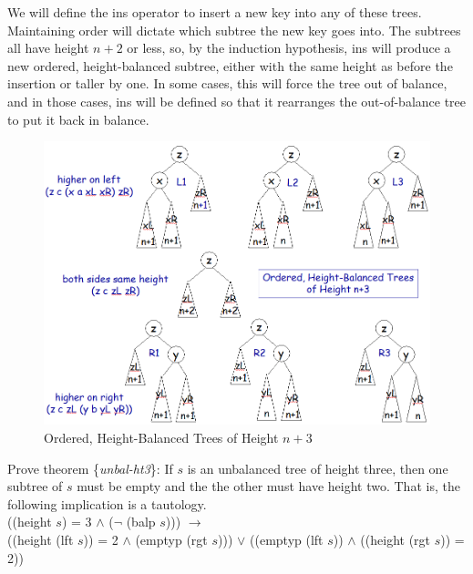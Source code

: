 We will define the ins operator to insert a new key into any of these trees.
Maintaining order will dictate which subtree the new key goes into.
The subtrees all have height $n+2$ or less, so, by the induction hypothesis,
ins will produce a new ordered, height-balanced subtree,
either with the same height as before the insertion or taller by one.
In some cases, this will force the tree out of balance,
and in those cases, ins will be defined so that it rearranges
the out-of-balance tree to put it back in balance.

\begin{figure}
\begin{center}
\includegraphics[scale=0.5]{images/avl-trees-ht3-or-more.png}
\end{center}
\caption{Ordered, Height-Balanced Trees of Height $n+3$}
\label{fig:trees-of-ht-n+3}
\end{figure}

\begin{ExerciseList}
\Exercise Prove
\label{thm:unbal-ht3}
theorem \{\emph{unbal-ht3}\}:
If $s$ is an unbalanced tree of height three,
then one subtree of $s$ must be empty and the the other must have height two.
That is, the following implication is a tautology. \\
((height $s$) = 3 $\wedge$ ($\neg$ (balp $s$)))
$\rightarrow$  \\
((height (lft $s$)) = 2 $\wedge$ (emptyp (rgt $s$)))
$\vee$
((emptyp (lft $s$)) $\wedge$ ((height (rgt $s$)) = 2))
\end{ExerciseList}

